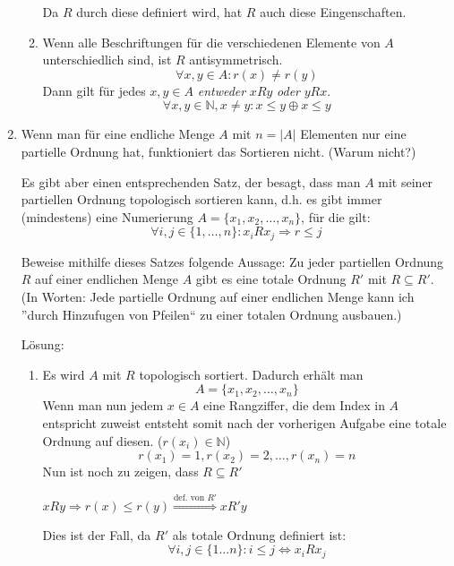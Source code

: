 \documentclass[main.tex]{subfiles}
\begin{document}
\begin{enumerate}
\begin{enumerate}
		            Da \( R  \) durch diese definiert wird, hat \( R \) auch diese Eingenschaften.

		      \item Wenn alle Beschriftungen für die verschiedenen Elemente von \( A \) unterschiedlich
		            sind, ist \( R \) antisymmetrisch.
		            \[ \forall x,y \in A: r(x) \neq r(y) \]
		            Dann gilt für jedes \( x,y \in A \) \textit{entweder} \( xRy \)
		            \textit{oder} \( yRx \).
		            \[ \forall x,y \in \mathbb{N}, x \neq y: x \leq y \oplus x \leq y \]
	      \end{enumerate}
	\item Wenn man für eine endliche Menge \( A \) mit \( n = |A| \) Elementen nur eine
	      partielle Ordnung hat, funktioniert das Sortieren nicht. (Warum nicht?)

	      Es gibt aber einen entsprechenden Satz, der besagt, dass man \( A \) mit seiner
	      partiellen Ordnung topologisch sortieren kann, d.h. es gibt immer (mindestens)
	      eine Numerierung \( A = \{ x_1, x_2, \dots, x_n \} \), für die gilt:
	      \[ \forall i, j \in \{ 1, \dots, n\} : x_iRx_j \Rightarrow r \leq j \]

	      Beweise mithilfe dieses Satzes folgende Aussage: Zu jeder partiellen Ordnung
	      \( R \) auf einer endlichen Menge \( A \) gibt es eine totale Ordnung \( R' \)
	      mit \( R \subseteq R' \). (In Worten:
	      Jede partielle Ordnung auf einer endlichen Menge kann ich ”durch
	      Hinzufugen von Pfeilen“ zu einer totalen Ordnung ausbauen.)

	      Lösung:
	      \begin{enumerate}
		      \item Es wird \( A \) mit \( R \) topologisch sortiert. Dadurch erhält man
		            \[ A = \{x_1, x_2, \dots, x_n\} \]
		            Wenn man nun jedem \( x \in A \) eine Rangziffer, die dem Index in
		            \( A \) entspricht zuweist entsteht somit nach der vorherigen Aufgabe
		            eine totale Ordnung auf diesen. (\( r(x_i) \in \mathbb{N} \))
		            \[ r(x_1) = 1, r(x_2) = 2, \dots, r(x_n) = n \]
		            Nun ist noch zu zeigen, dass \( R \subseteq R' \)

		            \( xRy \Rightarrow r(x) \leq r(y) \stackrel{\text{def. von } R'}{\Rightarrow} xR'y \)

		            Dies ist der Fall, da \( R' \) als totale Ordnung definiert ist:
		            \[ \forall i,j \in \{ 1 \dots n\} : i \leq j \Leftrightarrow x_iRx_j \]
	      \end{enumerate}
\end{enumerate}
\end{document}
